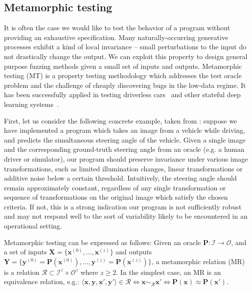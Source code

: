 \documentclass[12pt,initial,twoside,maitrise]{dms}
\numberwithin{equation}{section}
\numberwithin{table}{chapter}
\numberwithin{figure}{chapter}
\begin{document}
\subsection{Metamorphic testing}\label{subsec:metamorphic-testing}

It is often the case we would like to test the behavior of a program without providing an exhaustive specification. Many naturally-occurring generative processes exhibit a kind of local invariance -- small perturbations to the input do not drastically change the output. We can exploit this property to design general purpose fuzzing methods given a small set of inputs and outputs. Metamorphic testing (MT) is a property testing methodology which addresses the test oracle problem and the challenge of cheaply discovering bugs in the low-data regime. It has been successfully applied in testing driverless cars~\citep{zhou2019metamorphic, pei2017deepxplore, tian2018deeptest} and other stateful deep learning systems~\citep{du2018deepcruiser}.

First, let us consider the following concrete example, taken from \citet{tian2018deeptest}: suppose we have implemented a program which takes an image from a vehicle while driving, and predicts the simultaneous steering angle of the vehicle. Given a single image and the corresponding ground-truth steering angle from an oracle (e.g. a human driver or simulator), our program should preserve invariance under various image transformations, such as limited illumination changes, linear transformations or additive noise below a certain threshold. Intuitively, the steering angle should remain approximately constant, regardless of any single transformation or sequence of transformations on the original image which satisfy the chosen criteria. If not, this is a strong indication our program is not sufficiently robust and may not respond well to the sort of variability likely to be encountered in an operational setting.

Metamorphic testing can be expressed as follows: Given an oracle $\mathbf P: \mathcal I \rightarrow \mathcal O$, and a set of inputs $\mathbf X = \{\mathbf{x}^{(0)}, \dots, \mathbf{x}^{(z)}\}$ and outputs $\mathbf Y = \{\mathbf{y}^{(0)} = \mathbf{P}(\mathbf{x}^{(0)}), \dots, \mathbf{y}^{(z)} = \mathbf{P}(\mathbf{x}^{(z)})\}$, a metamorphic relation (MR) is a relation $\mathcal R \subset \mathcal I^z \times \mathcal O^z$ where $z \geq 2$. In the simplest case, an MR is an equivalence relation, e.g.: $\langle \mathbf x, \mathbf y, \mathbf x', \mathbf y' \rangle \in \mathcal R \Leftrightarrow \mathbf x \sim_{\mathcal R} \mathbf x' \Leftrightarrow \mathbf P(\mathbf x) \approx \mathbf P(\mathbf x')$.
\end{document}
